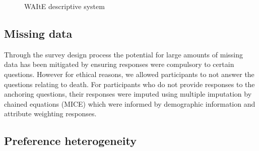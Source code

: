 \documentclass[
  number,
  preprint]{elsarticle}
\begin{document}
\begin{figure}


\caption{\label{fig-waite-descriptive}WAItE descriptive system}

\end{figure}%

\subsection{Missing data}\label{missing-data}

Through the survey design process the potential for large amounts of
missing data has been mitigated by ensuring responses were compulsory to
certain questions. However for ethical reasons, we allowed participants
to not answer the questions relating to death. For participants who do
not provide responses to the anchoring questions, their responses were
imputed using multiple imputation by chained equations (MICE)
\citep{White2011MultiplePractice} which were informed by demographic
information and attribute weighting responses.

\subsection{Preference heterogeneity}\label{preference-heterogeneity}
\end{document}
